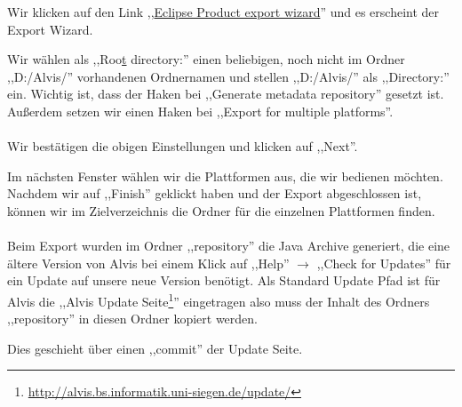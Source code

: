 \documentclass[10pt,a4paper,oneside]{scrbook}
\begin{document}
Wir klicken auf den  Link ,,\underline{Eclipse Product export wizard}'' und es erscheint der Export Wizard.

\begin{center}
\end{center}

Wir wählen als ,,Roo\underline{t} directory:'' einen beliebigen, noch nicht im Ordner ,,D:/Alvis/'' vorhandenen Ordnernamen und stellen ,,D:/Alvis/'' als ,,Directory:'' ein. 
Wichtig ist, dass der Haken bei ,,Generate metadata repository'' gesetzt ist.
Außerdem setzen wir einen Haken bei ,,Export for multiple platforms''.\\ \\
Wir bestätigen die obigen Einstellungen und klicken auf ,,Next''.
\begin{center}
\end{center}
Im nächsten Fenster wählen wir die Plattformen aus, die wir bedienen möchten.
Nachdem wir auf ,,Finish'' geklickt haben und der Export abgeschlossen ist, können wir im Zielverzeichnis die Ordner für die einzelnen Plattformen finden.
\\ \\
Beim Export wurden im Ordner ,,repository'' die Java Archive generiert, die eine ältere Version von Alvis bei einem Klick auf ,,Help'' \(\rightarrow \) ,,Check for Updates'' für ein Update auf unsere neue Version benötigt. Als Standard Update Pfad ist für Alvis die ,,Alvis Update Seite\footnote{\url{http://alvis.bs.informatik.uni-siegen.de/update/}}'' eingetragen also muss der Inhalt des Ordners ,,repository'' in diesen Ordner kopiert werden.

Dies geschieht über einen ,,commit'' der Update Seite.
\end{document}
